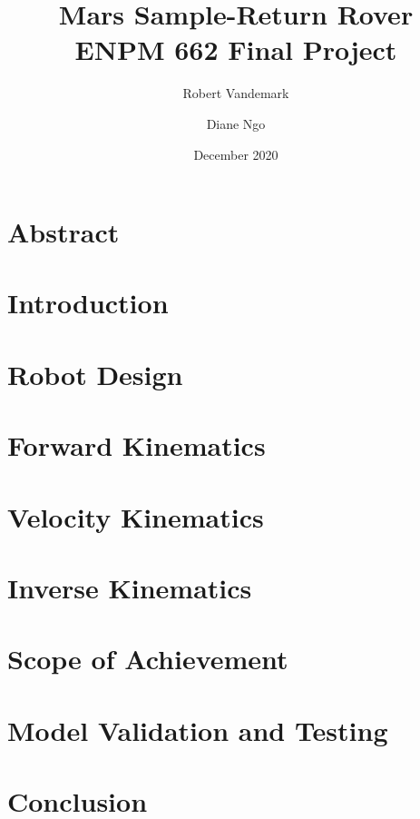 \documentclass[a4paper, 12pt]{report}
\title{Mars Sample-Return Rover \\
\large ENPM 662 Final Project}
\date{December 2020}
\author{Robert Vandemark \and Diane Ngo}
\begin{document}
	
	\setcounter{page}{1}
	\maketitle
	
	\tableofcontents
	\newpage
	
	\chapter{Abstract}
	

	\chapter{Introduction}
	

	\chapter{Robot Design}
	

	\chapter{Forward Kinematics}
	

	\chapter{Velocity Kinematics}
	

	\chapter{Inverse Kinematics}
	

	\chapter{Scope of Achievement}
	

	\chapter{Model Validation and Testing}
	

	\chapter{Conclusion}
	
	
	\begin{center}
		\printbibliography[heading=bibintoc, title={Bibliography}]
	\end{center}
\end{document}
